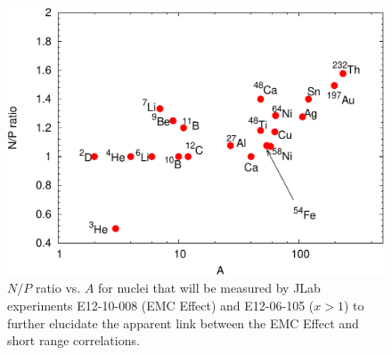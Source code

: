 \begin{figure}[tbp]
  \includegraphics[width=\columnwidth]{plots/np_ratios_2017-crop.pdf}
  \caption{$N/P$ ratio vs. $A$ for nuclei that will be measured by JLab experiments E12-10-008 (EMC Effect)
    and E12-06-105 ($x>1$) to further elucidate the apparent link between the EMC Effect and short range
    correlations.}
  \label{fig:np_ratios}
\end{figure}
